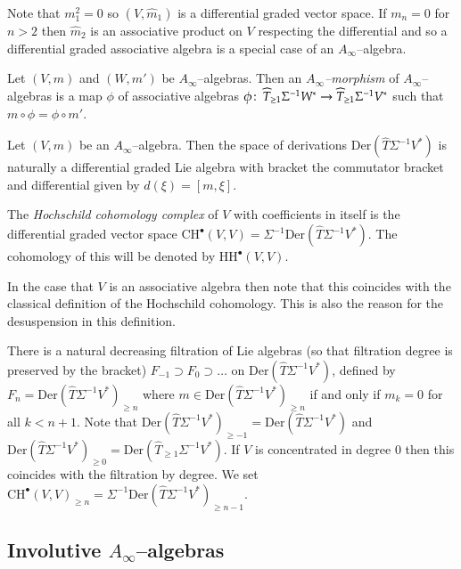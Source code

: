 \documentclass[british]{amsart}
\theoremstyle{plain}
\theoremstyle{definition}
{
\newaliascnt{{definition}}{theorem}\newtheorem{{definition}}[{definition}]{{Definition}}\aliascntresetthe{{definition}}\expandafterautorefname\endcsname{{Definition}}}
{
\newaliascnt{{remark}}{theorem}\newtheorem{{remark}}[{remark}]{{Remark}}\aliascntresetthe{{remark}}\expandafterautorefname\endcsname{{Remark}}}
{
\newaliascnt{{example}}{theorem}\newtheorem{{example}}[{example}]{{Example}}\aliascntresetthe{{example}}\expandafterautorefname\endcsname{{Example}}}
{
\newaliascnt{{examples}}{theorem}\newtheorem{{examples}}[{examples}]{{Examples}}\aliascntresetthe{{examples}}\expandafterautorefname\endcsname{{Examples}}}
{
\newaliascnt{{notation}}{theorem}\newtheorem{{notation}}[{notation}]{{Notation}}\aliascntresetthe{{notation}}\expandafterautorefname\endcsname{{Notation}}}
{
\newaliascnt{{convention}}{theorem}\newtheorem{{convention}}[{convention}]{{Convention}}\aliascntresetthe{{convention}}\expandafterautorefname\endcsname{{Convention}}}
\numberwithin{equation}{section}
\numberwithin{figure}{section}
\begin{document}
Note that $m_1^2 = 0$ so $(V,\hat{m}_1)$ is a differential graded vector space. If $m_n = 0$ for $n > 2$ then $\hat{m}_2$ is an associative product on $V$ respecting the differential and so a differential graded associative algebra is a special case of an $A_\infty$--algebra.

\begin{definition}
Let $(V,m)$ and $(W,m')$ be $A_\infty$--algebras. Then an \emph{$A_\infty$--morphism} of $A_\infty$--algebras is a map $\phi$ of associative algebras $\phi{\colon\thinspace}\widehat{T}_{\geq 1}\Sigma^{-1}W^*\rightarrow \widehat{T}_{\geq 1}\Sigma^{-1}V^*$ such that $m \circ\phi = \phi\circ m'$.
\end{definition}

\begin{definition}
Let $(V,m)$ be an $A_\infty$--algebra. Then the space of derivations ${\mathrm{Der}}(\widehat{T}\Sigma^{-1}V^*)$ is naturally a differential graded Lie algebra with bracket the commutator bracket and differential given by $d(\xi)=[m,\xi]$.

The \emph{Hochschild cohomology complex} of $V$ with coefficients in itself is the differential graded vector space ${\mathrm{CH}}^{\bullet}(V,V) = \Sigma^{-1}{\mathrm{Der}}(\widehat{T}\Sigma^{-1}V^*)$. The cohomology of this will be denoted by ${\mathrm{HH}}^{\bullet}(V,V)$.
\end{definition}

In the case that $V$ is an associative algebra then note that this coincides with the classical definition of the Hochschild cohomology. This is also the reason for the desuspension in this definition.

There is a natural decreasing filtration of Lie algebras (so that filtration degree is preserved by the bracket) $F_{-1}\supset F_0\supset \dots $ on ${\mathrm{Der}}(\widehat{T}\Sigma^{-1}V^*)$, defined by $F_n={\mathrm{Der}}(\widehat{T}\Sigma^{-1}V^*)_{\geq n}$ where $m\in {\mathrm{Der}}(\widehat{T}\Sigma^{-1}V^*)_{\geq n}$ if and only if $m_k = 0$ for all $k<n+1$. Note that ${\mathrm{Der}}(\widehat{T}\Sigma^{-1}V^*)_{\geq -1} = {\mathrm{Der}}(\widehat{T}\Sigma^{-1}V^*)$ and ${\mathrm{Der}}(\widehat{T}\Sigma^{-1}V^*)_{\geq 0} = {\mathrm{Der}}(\widehat{T}_{\geq 1}\Sigma^{-1}V^*)$. If $V$ is concentrated in degree $0$ then this coincides with the filtration by degree. We set ${\mathrm{CH}}^\bullet(V,V)_{\geq n} = \Sigma^{-1}{\mathrm{Der}}(\widehat{T}\Sigma^{-1}V^*)_{\geq n-1}$.

\subsection{Involutive \texorpdfstring{$A_\infty$--}{A-infinity }algebras}
\end{document}
